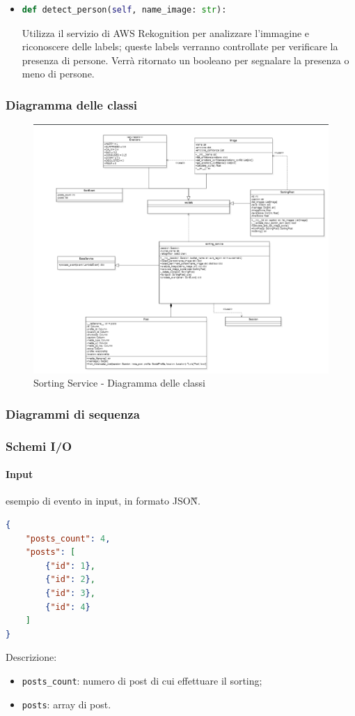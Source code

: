 \begin{itemize}
	\item
	\begin{lstlisting}[language=Python, numbers=none]	
def detect_person(self, name_image: str):
	\end{lstlisting}	
Utilizza il servizio di AWS Rekognition per analizzare l'immagine e riconoscere delle labels; queste labels verranno controllate per verificare la presenza di persone. Verrà ritornato un booleano per segnalare la presenza o meno di persone.
\end{itemize}
\newpage
\subsubsection{Diagramma delle classi}
\begin{figure}[!h]
    \includegraphics[width=15cm]{sezioni/images/cd_sorting.png}
    \caption{Sorting Service - Diagramma delle classi}
\end{figure}
\subsubsection{Diagrammi di sequenza}

\subsubsection{Schemi I/O}
\paragraph*{Input} esempio di evento in input, in formato JSON\G{}.
\begin{lstlisting}[language=JSON]
{
    "posts_count": 4,
    "posts": [
        {"id": 1},
        {"id": 2},
        {"id": 3},
        {"id": 4}
    ]
}
\end{lstlisting}
Descrizione:
\begin{itemize}
    \item \verb|posts_count|: numero di post di cui effettuare il sorting;
    \item \verb|posts|: array di post. 
\end{itemize}

